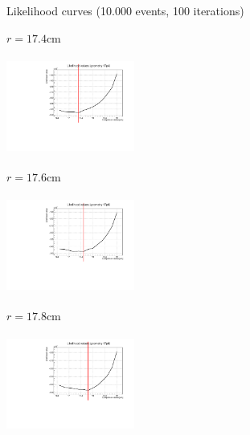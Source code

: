 \documentclass[8 pt]{beamer}
\begin{document}
\begin{frame}{Likelihood curves (10.000 events, 100 iterations)}
\vspace{-5pt}
\begin{minipage}[c]{.32\textwidth}
\begin{exampleblock}{} \begin{center}$r = 17.4$cm\end{center} \end{exampleblock}
\includegraphics[width=4.2cm, height=3.2cm]{figs/likelihood100LowStat/likelihood17p4.pdf} 
\end{minipage}
\begin{minipage}[c]{.32\textwidth}
\begin{exampleblock}{} \begin{center}$r = 17.6$cm\end{center} \end{exampleblock}
\includegraphics[width=4.2cm, height=3.2cm]{figs/likelihood100LowStat/likelihood17p6.pdf} 
\end{minipage}
\begin{minipage}[c]{.32\textwidth}
\begin{exampleblock}{} \begin{center}$r = 17.8$cm\end{center} \end{exampleblock}
\includegraphics[width=4.2cm, height=3.2cm]{figs/likelihood100LowStat/likelihood17p8.pdf} 
\end{minipage}
\end{frame}
\end{document}
